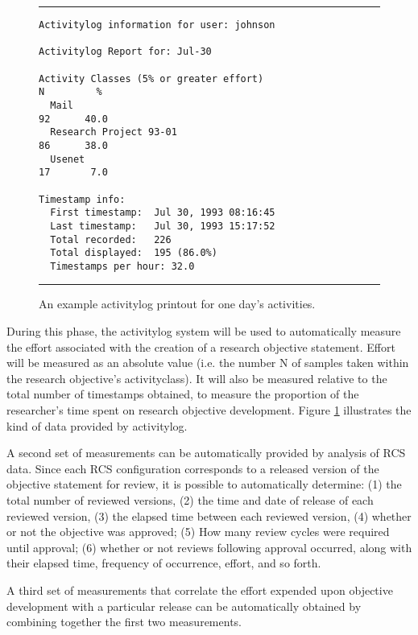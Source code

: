 \small \begin{figure}
\hrule

\medskip
\begin{verbatim}
Activitylog information for user: johnson

Activitylog Report for: Jul-30

Activity Classes (5% or greater effort)                         N         %
  Mail                                                         92      40.0
  Research Project 93-01                                       86      38.0
  Usenet                                                       17       7.0

Timestamp info:
  First timestamp:  Jul 30, 1993 08:16:45
  Last timestamp:   Jul 30, 1993 15:17:52
  Total recorded:   226
  Total displayed:  195 (86.0%)
  Timestamps per hour: 32.0
\end{verbatim}
\hrule
\label{fig:activitylog}
\caption{An example activitylog printout for one day's activities.}
\end{figure}\normalsize

 During this phase, the activitylog system
will be used to automatically measure the effort associated with the
creation of a research objective statement.  Effort will be measured as an
absolute value (i.e.  the number N of samples taken within the research
objective's activityclass).  It will also be measured relative to the total
number of timestamps obtained, to measure the proportion of the
researcher's time spent on research objective development. Figure
\ref{fig:activitylog} illustrates the kind of data provided by activitylog.

 A second set of measurements can be
automatically provided by analysis of RCS data.  Since each RCS
configuration corresponds to a released version of the objective statement
for review, it is possible to automatically determine: (1) the total number
of reviewed versions, (2) the time and date of release of each reviewed
version, (3) the elapsed time between each reviewed version, (4) whether or not
the objective was approved; (5) How many review cycles were required until
approval; (6) whether or not reviews following approval occurred, along
with their elapsed time, frequency of occurrence, effort, and so forth.

 A third set of measurements 
that correlate the effort expended upon objective development with
a particular release can be automatically obtained by combining together the 
first two measurements.


